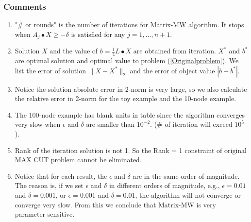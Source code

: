 \documentclass[12pt]{article}
\begin{document}
\subsubsection{Comments}

\begin{enumerate}
\item
"\# or rounds" is the number of iterations for Matrix-MW algorithm. It stops when $A_j \bullet X  \geqslant -\delta$ is satisfied for any $j = 1, \dots, n+1$. 

\item
Solution $X$ and the value of $b = \frac{1}{4} L \bullet X$ are obtained from iteration. $X^*$ and $b^*$ are optimal solution and optimal value to problem (\ref{Originalproblem}). We list the error of solution $\|X- X^*\|_2$ and the error of object value $|b - b^*|$.

\item Notice the solution absolute error in 2-norm is very large, so we also calculate the relative error in 2-norm for the toy example and the 10-node example.


\item
The 100-node example has blank units in table since the algorithm converges very slow when $\epsilon$ and $\delta$ are smaller than $10^{-2}$. (\# of iteration will exceed $10^{5}$ ). 

\item
Rank of the iteration solution is not 1. So the Rank = 1 constraint of original MAX CUT problem cannot be eliminated.


\item 
Notice that for each result, the $\epsilon$ and $\delta$ are in the same order of magnitude. The reason is, if we set $\epsilon$ and $\delta$ in different orders of magnitude, e.g., $\epsilon = 0.01$ and $\delta = 0.001$, or $\epsilon = 0.001$ and $\delta = 0.01$, the algorithm will not converge or converge very slow. From this we conclude that Matrix-MW is very parameter sensitive.

\end{enumerate}
\end{document}
